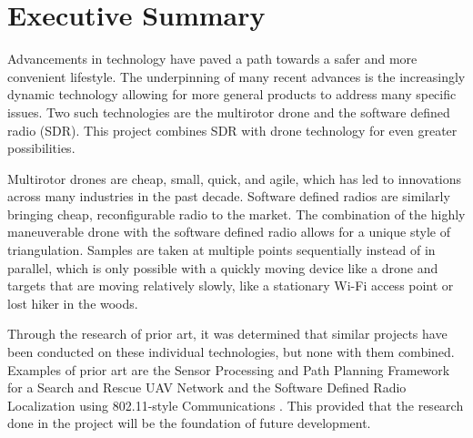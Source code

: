 \chapter*{Executive Summary}
Advancements in technology have paved a path towards a safer and more convenient lifestyle. The underpinning of many recent advances is the increasingly dynamic technology allowing for more general products to address many specific issues. Two such technologies are the multirotor drone and the software defined radio (SDR). This project combines SDR with drone technology for even greater possibilities. \par

Multirotor drones are cheap, small, quick, and agile, which has led to innovations across many industries in the past decade. Software defined radios are similarly bringing cheap, reconfigurable radio to the market. The combination of the highly maneuverable drone with the software defined radio allows for a unique style of triangulation. Samples are taken at multiple points sequentially instead of in parallel, which is only possible with a quickly moving device like a drone and targets that are moving relatively slowly, like a stationary Wi-Fi access point or lost hiker in the woods. \par

Through the research of prior art, it was determined that similar projects have been conducted on these individual technologies, but none with them combined. Examples of prior art are the Sensor Processing and Path Planning Framework for a Search and Rescue UAV Network \cite{path_planning_snr_mqp} and the Software Defined Radio Localization using 802.11-style Communications \cite{sdr_localization_mqp}. This provided that the research done in the project will be the foundation of future development. \par


